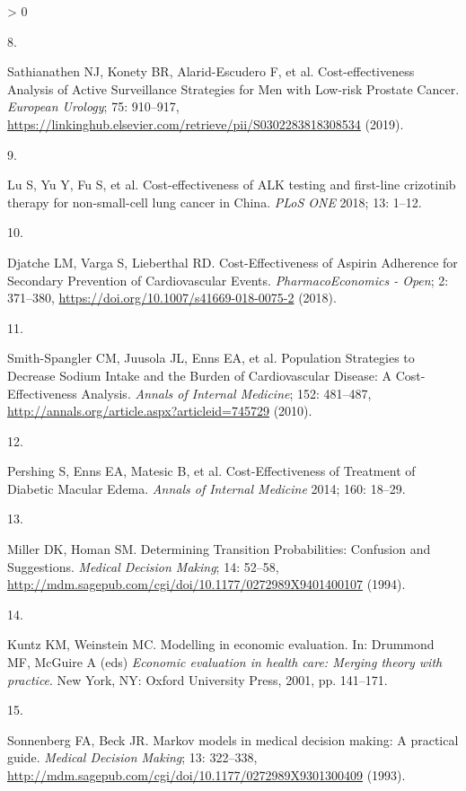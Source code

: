 \documentclass[
]{article}
\newlength{\cslhangindent}
\newlength{\csllabelwidth}
\newenvironment{CSLReferences}[2] %
 {%
  \setlength{\parindent}{0pt}
  \ifodd #1 \everypar{\setlength{\hangindent}{\cslhangindent}}\ignorespaces\fi
  \ifnum #2 > 0
  \setlength{\parskip}{#2\baselineskip}
  \fi
 }%
 {}
\newcommand{\CSLLeftMargin}[1]{\parbox[t]{\csllabelwidth}{#1}}
\newcommand{\CSLRightInline}[1]{\parbox[t]{\linewidth - \csllabelwidth}{#1}\break}
\begin{document}
\begin{CSLReferences}{0}{0}
\leavevmode\hypertarget{ref-Sathianathen2018a}{}%
\CSLLeftMargin{8. }
\CSLRightInline{Sathianathen NJ, Konety BR, Alarid-Escudero F, et al. {Cost-effectiveness Analysis of Active Surveillance Strategies for Men with Low-risk Prostate Cancer}. \emph{European Urology}; 75: 910--917, \url{https://linkinghub.elsevier.com/retrieve/pii/S0302283818308534} (2019).}

\leavevmode\hypertarget{ref-Lu2018b}{}%
\CSLLeftMargin{9. }
\CSLRightInline{Lu S, Yu Y, Fu S, et al. {Cost-effectiveness of ALK testing and first-line crizotinib therapy for non-small-cell lung cancer in China}. \emph{PLoS ONE} 2018; 13: 1--12.}

\leavevmode\hypertarget{ref-Djatche2018}{}%
\CSLLeftMargin{10. }
\CSLRightInline{Djatche LM, Varga S, Lieberthal RD. {Cost-Effectiveness of Aspirin Adherence for Secondary Prevention of Cardiovascular Events}. \emph{PharmacoEconomics - Open}; 2: 371--380, \url{https://doi.org/10.1007/s41669-018-0075-2} (2018).}

\leavevmode\hypertarget{ref-Smith-Spangler2010}{}%
\CSLLeftMargin{11. }
\CSLRightInline{Smith-Spangler CM, Juusola JL, Enns EA, et al. {Population Strategies to Decrease Sodium Intake and the Burden of Cardiovascular Disease: A Cost-Effectiveness Analysis}. \emph{Annals of Internal Medicine}; 152: 481--487, \url{http://annals.org/article.aspx?articleid=745729} (2010).}

\leavevmode\hypertarget{ref-Pershing2014}{}%
\CSLLeftMargin{12. }
\CSLRightInline{Pershing S, Enns EA, Matesic B, et al. {Cost-Effectiveness of Treatment of Diabetic Macular Edema}. \emph{Annals of Internal Medicine} 2014; 160: 18--29.}

\leavevmode\hypertarget{ref-Miller1994}{}%
\CSLLeftMargin{13. }
\CSLRightInline{Miller DK, Homan SM. {Determining Transition Probabilities: Confusion and Suggestions}. \emph{Medical Decision Making}; 14: 52--58, \url{http://mdm.sagepub.com/cgi/doi/10.1177/0272989X9401400107} (1994).}

\leavevmode\hypertarget{ref-Kuntz2001}{}%
\CSLLeftMargin{14. }
\CSLRightInline{Kuntz KM, Weinstein MC. {Modelling in economic evaluation}. In: Drummond MF, McGuire A (eds) \emph{Economic evaluation in health care: Merging theory with practice}. New York, NY: Oxford University Press, 2001, pp. 141--171.}

\leavevmode\hypertarget{ref-Sonnenberg1993}{}%
\CSLLeftMargin{15. }
\CSLRightInline{Sonnenberg FA, Beck JR. {Markov models in medical decision making: A practical guide}. \emph{Medical Decision Making}; 13: 322--338, \url{http://mdm.sagepub.com/cgi/doi/10.1177/0272989X9301300409} (1993).}


\end{CSLReferences}
\end{document}

